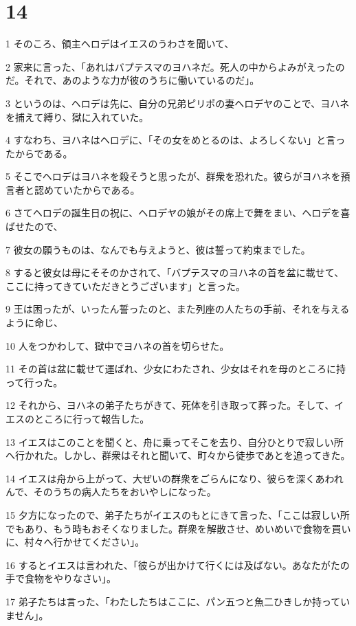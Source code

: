 \chapter{14}

\par 1 そのころ、領主ヘロデはイエスのうわさを聞いて、
\par 2 家来に言った、「あれはバプテスマのヨハネだ。死人の中からよみがえったのだ。それで、あのような力が彼のうちに働いているのだ」。
\par 3 というのは、ヘロデは先に、自分の兄弟ピリポの妻ヘロデヤのことで、ヨハネを捕えて縛り、獄に入れていた。
\par 4 すなわち、ヨハネはヘロデに、「その女をめとるのは、よろしくない」と言ったからである。
\par 5 そこでヘロデはヨハネを殺そうと思ったが、群衆を恐れた。彼らがヨハネを預言者と認めていたからである。
\par 6 さてヘロデの誕生日の祝に、ヘロデヤの娘がその席上で舞をまい、ヘロデを喜ばせたので、
\par 7 彼女の願うものは、なんでも与えようと、彼は誓って約束までした。
\par 8 すると彼女は母にそそのかされて、「バプテスマのヨハネの首を盆に載せて、ここに持ってきていただきとうございます」と言った。
\par 9 王は困ったが、いったん誓ったのと、また列座の人たちの手前、それを与えるように命じ、
\par 10 人をつかわして、獄中でヨハネの首を切らせた。
\par 11 その首は盆に載せて運ばれ、少女にわたされ、少女はそれを母のところに持って行った。
\par 12 それから、ヨハネの弟子たちがきて、死体を引き取って葬った。そして、イエスのところに行って報告した。
\par 13 イエスはこのことを聞くと、舟に乗ってそこを去り、自分ひとりで寂しい所へ行かれた。しかし、群衆はそれと聞いて、町々から徒歩であとを追ってきた。
\par 14 イエスは舟から上がって、大ぜいの群衆をごらんになり、彼らを深くあわれんで、そのうちの病人たちをおいやしになった。
\par 15 夕方になったので、弟子たちがイエスのもとにきて言った、「ここは寂しい所でもあり、もう時もおそくなりました。群衆を解散させ、めいめいで食物を買いに、村々へ行かせてください」。
\par 16 するとイエスは言われた、「彼らが出かけて行くには及ばない。あなたがたの手で食物をやりなさい」。
\par 17 弟子たちは言った、「わたしたちはここに、パン五つと魚二ひきしか持っていません」。
